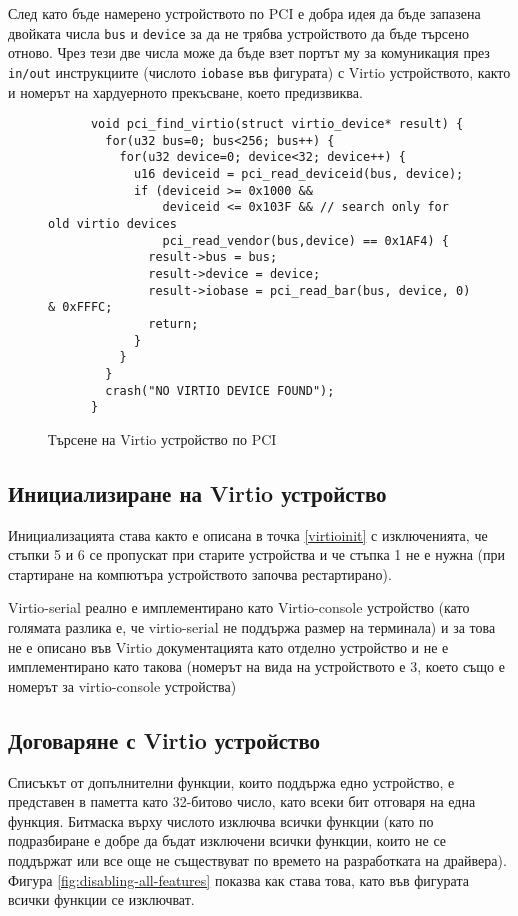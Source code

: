   След като бъде намерено устройството по PCI е добра идея да бъде запазена двойката числа {\tt bus} и {\tt device} за да не трябва устройството да бъде търсено отново. Чрез тези две числа може да бъде взет портът му за комуникация през {\tt in/out} инструкциите (числото {\tt iobase} във фигурата) с Virtio устройството, както и номерът на хардуерното прекъсване, което предизвиква.

  \begin{figure}[ht]
    \centering
    \begin{verbatim}
      void pci_find_virtio(struct virtio_device* result) {
        for(u32 bus=0; bus<256; bus++) {
          for(u32 device=0; device<32; device++) {
            u16 deviceid = pci_read_deviceid(bus, device);
            if (deviceid >= 0x1000 &&
                deviceid <= 0x103F && // search only for old virtio devices
                pci_read_vendor(bus,device) == 0x1AF4) {
              result->bus = bus;
              result->device = device;
              result->iobase = pci_read_bar(bus, device, 0) & 0xFFFC;
              return;
            }
          }
        }
        crash("NO VIRTIO DEVICE FOUND");
      }
    \end{verbatim}
    \caption{Търсене на Virtio устройство по PCI}
    \label{fig:finding-virtio}
  \end{figure}

  \subsection{Инициализиране на Virtio устройство}
  Инициализацията става както е описана в точка \ref{virtioinit} с изключенията, че стъпки 5 и 6 се пропускат при старите устройства и че стъпка 1 не е нужна (при стартиране на компютъра устройството започва рестартирано).

  Virtio-serial реално е имплементирано като Virtio-console устройство (като голямата разлика е, че virtio-serial не поддържа размер на терминала) и за това не е описано във Virtio документацията като отделно устройство и не е имплементирано като такова (номерът на вида на устройството е $3$, което също е номерът за virtio-console устройства)

  \subsection{Договаряне с Virtio устройство}
  Списъкът от допълнителни функции, които поддържа едно устройство, е представен в паметта като 32-битово число, като всеки бит отговаря на една функция. Битмаска върху числото изключва всички функции (като по подразбиране е добре да бъдат изключени всички функции, които не се поддържат или все още не съществуват по времето на разработката на драйвера). Фигура \ref{fig:disabling-all-features} показва как става това, като във фигурата всички функции се изключват.


